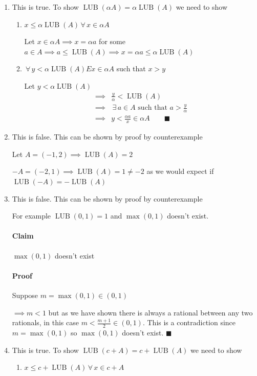 \documentclass{article}
\newcommand{\A}{\,\forall\,}
\newcommand{\E}{\,\exists\,}
\newcommand{\LUB}{\operatorname{LUB}}
\newcounter{example}[section]
\begin{document}
\begin{enumerate}
\item This is true. To show \(\LUB(\alpha A)=\alpha\LUB(A)\) we need to show
\begin{enumerate}
\item \(x\le\alpha\LUB(A)\A x\in\alpha A\)

Let \(x\in\alpha A\implies x=\alpha a\) for some \(a\in A\implies a\le\LUB(A)\implies x=\alpha a\le\alpha\LUB(A)\)
\item \(\A y<\alpha\LUB(A)E x\in\alpha A\) such that \(x>y\)

Let \(y<\alpha\LUB(A)\)
\begin{align*}
\implies &\frac y\alpha<\LUB(A)\\
\implies &\E a\in A\text{ such that }a>\frac y\alpha\\
\implies &y<\frac{\alpha a}{x}\in\alpha A\qquad\blacksquare
\end{align*}
\end{enumerate}
\item This is false. This can be shown by proof by counterexample

Let \(A=(-1,2)\implies\LUB(A)=2\)

\(-A=(-2,1)\implies\LUB(A)=1\ne -2\) as we would expect if \(\LUB(-A)=-\LUB(A)\)

\item This is false. This can be shown by proof by counterexample

For example \(\LUB(0,1)=1\) and \(\max(0,1)\) doesn't exist.

\paragraph{Claim} \(\max(0,1)\) doesn't exist

\paragraph{Proof} Suppose \(m=\max(0,1)\in(0,1)\)

\(\implies m<1\) but as we have shown there is always a rational between any two rationals, in this case \(m<\frac{m+1}{2}\in (0,1)\). This is a contradiction since \(m=\max(0,1)\) so \(\max(0,1)\) doesn't exist. \(\blacksquare\)

\item This is true. To show \(\LUB(c+A)=c+\LUB(A)\) we need to show
\begin{enumerate}
\item \(x\le c+\LUB(A)\A x\in c+A\)


\end{enumerate}
\end{enumerate}
\end{document}
